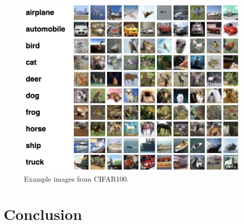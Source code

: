 \documentclass[conference]{IEEEtran}
\begin{document}
\begin{figure}[!t]
    \centering
    \includegraphics[width=\columnwidth]{imgs/cifar_100.jpg}
    \caption{Example images from CIFAR100.}
    \label{fig:segs}
\end{figure}

\section{Conclusion}
\end{document}
